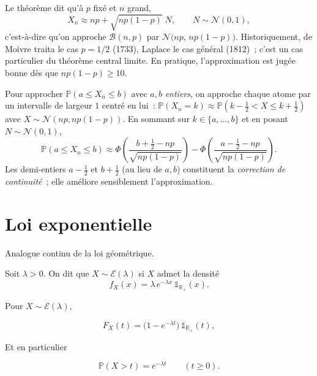 \begin{remarque}[Heuristique]
Le théorème dit qu'à $p$ fixé et $n$ grand,
\[
  X_n\approx np+\sqrt{np(1-p)}\;N,\qquad N\sim\mathcal N(0,1),
\]
c'est-à-dire qu'on approche $\mathcal{B}(n,p)$ par
$\mathcal N\big(np,\,np(1-p)\big)$. Historiquement, de Moivre traita le cas
$p=1/2$ (1733), Laplace le cas général (1812)~; c'est un cas particulier du
théorème central limite. En pratique, l'approximation est jugée bonne dès que
$np(1-p)\ge10$.
\end{remarque}

\begin{remarque}
Pour approcher $\mathbb{P}(a\le X_n\le b)$ avec $a,b$ \emph{entiers}, on approche
chaque atome par un intervalle de largeur $1$ centré en lui~:
$\mathbb{P}(X_n=k)\approx\mathbb{P}(k-\tfrac12<X\le k+\tfrac12)$ avec
$X\sim\mathcal N(np,np(1-p))$. En sommant sur $k\in\{a,\dots,b\}$ et en posant
$N\sim\mathcal N(0,1)$,
\[
  \mathbb{P}(a\le X_n\le b)\approx
  \Phi\!\left(\frac{b+\tfrac12-np}{\sqrt{np(1-p)}}\right)
  -\Phi\!\left(\frac{a-\tfrac12-np}{\sqrt{np(1-p)}}\right).
\]
Les demi-entiers $a-\tfrac12$ et $b+\tfrac12$ (au lieu de $a,b$) constituent
la \emph{correction de continuité}~; elle améliore sensiblement
l'approximation.
\end{remarque}

\section{Loi exponentielle}

Analogue continu de la loi géométrique.

\medskip

\begin{mdframed}
\begin{definition}
Soit $\lambda>0$. On dit que $X\sim\mathcal{E}(\lambda)$ si $X$ admet la densité
\[
  f_X(x)=\lambda\,e^{-\lambda x}\,\mathbb{1}_{\mathbb{R}_+}(x).
\]
\end{definition}
\end{mdframed}

\medskip

\begin{mdframed}
\begin{proposition}
Pour $X\sim\mathcal{E}(\lambda)$,

$$
  F_X(t)=\big(1-e^{-\lambda t}\big)\,\mathbb{1}_{\mathbb{R}_+}(t),
$$

Et en particulier

$$
  \mathbb{P}(X>t)=e^{-\lambda t} \qquad (t\ge0).
$$
\end{proposition}
\end{mdframed}

